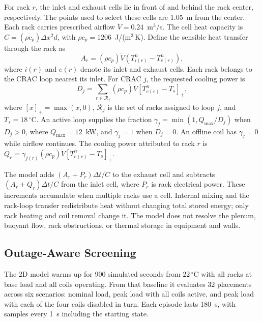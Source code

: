 \documentclass{ieeeaccess}
\begin{document}
For rack $r$, the inlet and exhaust cells lie in front of and behind the rack center, respectively. The points used to select these cells are 1.05~m from the center. Each rack carries prescribed airflow $\dot V=0.24$~m$^3$/s. The cell heat capacity is $C=(\rho c_p)\Delta x^2d$, with $\rho c_p=1206$~J/(m$^3$\,K). Define the sensible heat transfer through the rack as
\begin{equation}
A_r=(\rho c_p)\dot V(T_{i(r)}^n-T_{e(r)}^n),
\label{eq:rack-transfer}
\end{equation}
where $i(r)$ and $e(r)$ denote its inlet and exhaust cells. Each rack belongs to the CRAC loop nearest its inlet. For CRAC $j$, the requested cooling power is
\begin{equation}
D_j=\sum_{r\in\mathcal R_j}(\rho c_p)\dot V
[T_{e(r)}^n-T_s]_+,
\label{eq:demand}
\end{equation}
where $[x]_+=\max(x,0)$, $\mathcal R_j$ is the set of racks assigned to loop $j$, and $T_s=18\,^{\circ}\mathrm{C}$. An active loop supplies the fraction $\gamma_j=\min(1,Q_{\max}/D_j)$ when $D_j>0$, where $Q_{\max}=12$~kW, and $\gamma_j=1$ when $D_j=0$. An offline coil has $\gamma_j=0$ while airflow continues. The cooling power attributed to rack $r$ is $Q_r=\gamma_{j(r)}(\rho c_p)\dot V[T_{e(r)}^n-T_s]_+$.

The model adds $(A_r+P_r)\Delta t/C$ to the exhaust cell and subtracts $(A_r+Q_r)\Delta t/C$ from the inlet cell, where $P_r$ is rack electrical power. These increments accumulate when multiple racks use a cell. Internal mixing and the rack-loop transfer redistribute heat without changing total stored energy; only rack heating and coil removal change it. The model does not resolve the plenum, buoyant flow, rack obstructions, or thermal storage in equipment and walls.

\subsection{Outage-Aware Screening}
The 2D model warms up for 900 simulated seconds from $22\,^{\circ}\mathrm{C}$ with all racks at base load and all coils operating. From that baseline it evaluates 32 placements across six scenarios: nominal load, peak load with all coils active, and peak load with each of the four coils disabled in turn. Each episode lasts 180~s, with samples every 1~s including the starting state.
\end{document}
